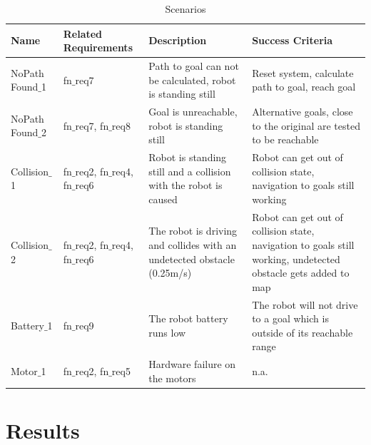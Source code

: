   	
\begin{table}[ht]
	\label{tab:behavior_scenarios}
	\caption{Scenarios}
	\begin{tabular}{| m{} | m{}| m{} | m{}|} 
	\hline
	Name & Related Requirements & Description & Success Criteria\\ 
  	\hline	
  	NoPath Found$\_$1 & fn$\_$req7 & Path to goal can not be calculated, robot is standing still &  
Reset system, calculate path to goal, reach goal \\
	\hline
	NoPath Found$\_$2 & fn$\_$req7, fn$\_$req8 & Goal is unreachable, robot is standing still & Alternative goals, close to the original are tested to be reachable \\
	\hline
	Collision$\_$1 & fn$\_$req2, fn$\_$req4, fn$\_$req6 & Robot is standing still and a collision with the robot is caused & Robot can get out of collision state, navigation to goals still working \\
	\hline
	Collision$\_$2 & fn$\_$req2, fn$\_$req4, fn$\_$req6 & The robot is driving and collides with an undetected obstacle (0.25m/s) &  
Robot can get out of collision state, navigation to goals still working, undetected obstacle gets added to map \\
	\hline
	Battery$\_$1 & fn$\_$req9 & The robot battery runs low & The robot will not drive to a goal which is outside of its reachable range \\
	\hline
	Motor$\_$1 & fn$\_$req2, fn$\_$req5 & Hardware failure on the motors & n.a. \\
	\hline
		
	\end{tabular}
\end{table}

\section{Results}

